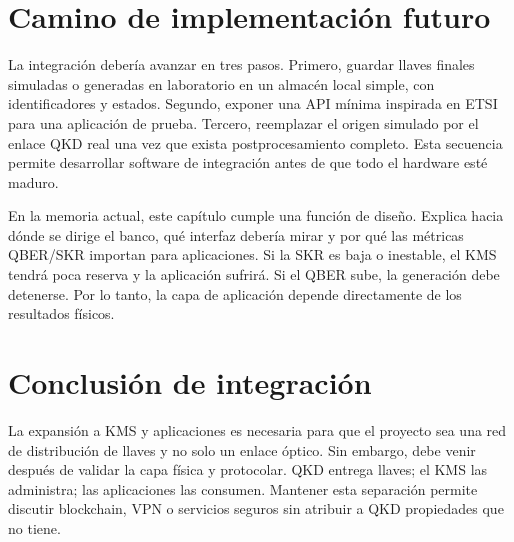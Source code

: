 \section{Camino de implementación futuro}

La integración debería avanzar en tres pasos. Primero, guardar llaves finales simuladas o generadas en laboratorio en un almacén local simple, con identificadores y estados. Segundo, exponer una API mínima inspirada en ETSI para una aplicación de prueba. Tercero, reemplazar el origen simulado por el enlace QKD real una vez que exista postprocesamiento completo. Esta secuencia permite desarrollar software de integración antes de que todo el hardware esté maduro.

En la memoria actual, este capítulo cumple una función de diseño. Explica hacia dónde se dirige el banco, qué interfaz debería mirar y por qué las métricas QBER/SKR importan para aplicaciones. Si la SKR es baja o inestable, el KMS tendrá poca reserva y la aplicación sufrirá. Si el QBER sube, la generación debe detenerse. Por lo tanto, la capa de aplicación depende directamente de los resultados físicos.

\section{Conclusión de integración}

La expansión a KMS y aplicaciones es necesaria para que el proyecto sea una red de distribución de llaves y no solo un enlace óptico. Sin embargo, debe venir después de validar la capa física y protocolar. QKD entrega llaves; el KMS las administra; las aplicaciones las consumen. Mantener esta separación permite discutir blockchain, VPN o servicios seguros sin atribuir a QKD propiedades que no tiene.
